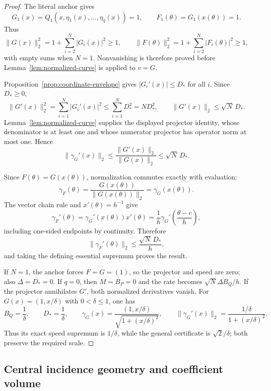 \begin{proof}
The literal anchor gives
\[
G_1(x)=Q_1(x,\eta_1(x),\ldots,\eta_q(x))=1,
\qquad
F_1(\theta)=G_1(x(\theta))=1.
\]
Thus
\[
\|G(x)\|_2^2=1+\sum_{i=2}^N|G_i(x)|^2\geq1,
\qquad
\|F(\theta)\|_2^2=1+\sum_{i=2}^N|F_i(\theta)|^2\geq1,
\]
with empty sums when $N=1$.  Nonvanishing is therefore proved before
Lemma~\ref{lem:normalized-curve} is applied to $v=G$.

Proposition~\ref{prop:coordinate-envelope} gives
$|G_i'(x)|\leq D_*$ for all $i$.  Since $D_*\geq0$,
\[
\|G'(x)\|_2^2
=\sum_{i=1}^N|G_i'(x)|^2
\leq\sum_{i=1}^ND_*^2=ND_*^2,
\qquad
\|G'(x)\|_2\leq\sqrt N\,D_*.
\]
Lemma~\ref{lem:normalized-curve} supplies the displayed projector identity,
whose denominator is at least one and whose numerator projector has operator
norm at most one.  Hence
\[
\|\gamma_G'(x)\|_2
\leq\frac{\|G'(x)\|_2}{\|G(x)\|_2}
\leq\sqrt N\,D_*.
\]

Since $F(\theta)=G(x(\theta))$, normalization commutes exactly with
evaluation:
\[
\gamma_F(\theta)
=\frac{G(x(\theta))}{\|G(x(\theta))\|_2}
=\gamma_G(x(\theta)).
\]
The vector chain rule \citep{rudin1976principles} and
$x'(\theta)=h^{-1}$ give
\[
\gamma_F'(\theta)
=\gamma_G'(x(\theta))x'(\theta)
=\frac1h\gamma_G'\!\left(\frac{\theta-c}{h}\right),
\]
including one-sided endpoints by continuity.  Therefore
\[
\|\gamma_F'(\theta)\|_2
\leq\frac{\sqrt N\,D_*}{h},
\]
and taking the defining essential supremum proves the result.

If $N=1$, the anchor forces $F=G=(1)$, so the projector and speed are zero;
also $\Delta=D_*=0$.  If $q=0$, then $M=B_P=0$ and the rate becomes
$\sqrt N\Delta B_Q/h$.  If the projector annihilates $G'$, both normalized
derivatives vanish.  For $G(x)=(1,x/\delta)$ with
$0<\delta\leq1$, one has
\[
B_Q=\frac1\delta,
\qquad
D_*=\frac1\delta,
\qquad
\gamma_G(x)=\frac{(1,x/\delta)}{\sqrt{1+(x/\delta)^2}},
\qquad
\|\gamma_G'(x)\|_2
=\frac{1/\delta}{1+(x/\delta)^2}.
\]
Thus its exact speed supremum is $1/\delta$, while the general certificate is
$\sqrt2/\delta$; both preserve the required scale.
\end{proof}

\subsection{Central incidence geometry and coefficient volume}
\label{app:central-incidence}

